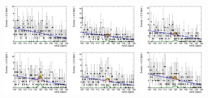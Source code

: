 




\begin{figure}[!htbp]
\begin{center}
 \includegraphics[width=0.3\textwidth]{figures_and_tables/modeling_xchecks/plots/HToUpsilon1SPhoton_Cat0_signalStrenght_100000/Cat0_mHZ_fit_s}
\includegraphics[width=0.3\textwidth]{figures_and_tables/modeling_xchecks/plots/HToUpsilon2SPhoton_Cat0_signalStrenght_100000/Cat0_mHZ_fit_s}
\includegraphics[width=0.3\textwidth]{figures_and_tables/modeling_xchecks/plots/HToUpsilon3SPhoton_Cat0_signalStrenght_100000/Cat0_mHZ_fit_s}
\includegraphics[width=0.3\textwidth]{figures_and_tables/modeling_xchecks/plots/HToUpsilon1SPhoton_Cat0_signalStrenght_200000/Cat0_mHZ_fit_s}
\includegraphics[width=0.3\textwidth]{figures_and_tables/modeling_xchecks/plots/HToUpsilon2SPhoton_Cat0_signalStrenght_200000/Cat0_mHZ_fit_s}
\includegraphics[width=0.3\textwidth]{figures_and_tables/modeling_xchecks/plots/HToUpsilon3SPhoton_Cat0_signalStrenght_200000/Cat0_mHZ_fit_s}

\end{center}
\end{figure}
